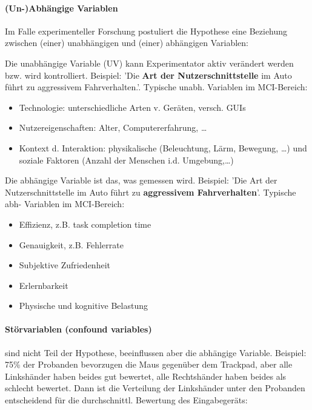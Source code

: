 				\paragraph{(Un-)Abhängige Variablen} Im Falle experimenteller Forschung postuliert die Hypothese eine Beziehung zwischen (einer) unabhängigen und (einer) abhängigen Variablen:
				
				Die unabhängige Variable (UV) kann Experimentator aktiv verändert werden bzw. wird kontrolliert. Beispiel: 'Die \textbf{Art der Nutzerschnittstelle} im Auto führt zu aggressivem Fahrverhalten.'. Typische unabh. Variablen im MCI-Bereich:
				\begin{itemize}
					\item Technologie: unterschiedliche Arten v. Geräten, versch. GUIs
					\item Nutzereigenschaften: Alter, Computererfahrung, \ldots
					\item Kontext d. Interaktion: physikalische (Beleuchtung, Lärm, Bewegung, \ldots) und soziale Faktoren (Anzahl der Menschen i.d. Umgebung,\ldots)
				\end{itemize} 
				Die abhängige Variable ist das, was gemessen wird. Beispiel: 'Die Art der Nutzerschnittstelle im Auto führt zu \textbf{aggressivem Fahrverhalten}'. Typische abh- Variablen im MCI-Bereich:
				\begin{itemize}
					\item Effizienz, z.B. task completion time
					\item Genauigkeit, z.B. Fehlerrate
					\item Subjektive Zufriedenheit
					\item Erlernbarkeit
					\item Physische und kognitive Belastung
				\end{itemize}
			\pagebreak
				\paragraph{Störvariablen (confound variables)} sind nicht Teil der Hypothese, beeinflussen aber die abhängige Variable. Beispiel: 75\% der Probanden bevorzugen die Maus gegenüber dem Trackpad, aber alle Linkshänder haben beides gut bewertet, alle Rechtshänder haben beides als schlecht bewertet. Dann ist die Verteilung der Linkshänder unter den Probanden entscheidend für die durchschnittl. Bewertung des Eingabegeräts:
			
